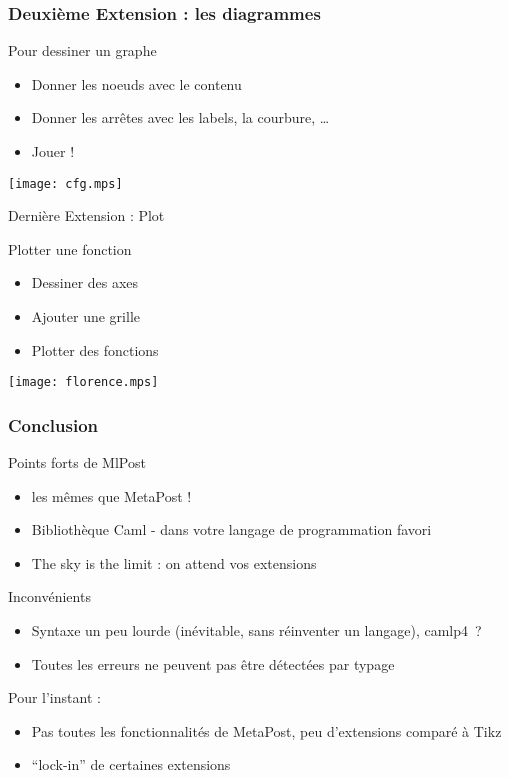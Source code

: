 \documentclass[nodefaultblocks]{beamer}
\begin{document}
\begin{frame}\frametitle{Deuxième Extension : les diagrammes}
  \begin{block}{Pour dessiner un graphe}
    \begin{itemize}
      \item Donner les noeuds avec le contenu
      \item Donner les arrêtes avec les labels, la courbure, \ldots
      \item Jouer ! 
    \end{itemize}
  \end{block}
  \begin{center}
    \texttt{[image: cfg.mps]}
  \end{center}
\end{frame}

\begin{frame}{Dernière Extension : Plot}
  \begin{block}{Plotter une fonction}
    \begin{itemize}
      \item Dessiner des axes
      \item Ajouter une grille
      \item Plotter des fonctions
    \end{itemize}
  \end{block}
  \begin{center}
    \texttt{[image: florence.mps]}
  \end{center}
\end{frame}

\begin{frame}\frametitle{Conclusion}

  \begin{block}{Points forts de MlPost}
    \begin{itemize}
      \item les mêmes que MetaPost ! 
      \item Bibliothèque Caml - dans votre langage de programmation favori
      \item The sky is the limit : on attend vos extensions
    \end{itemize}
  \end{block}
  
  \begin{block}{Inconvénients}
    \begin{itemize}
      \item Syntaxe un peu lourde (inévitable, sans réinventer un langage),
        camlp4~?
      \item Toutes les erreurs ne peuvent pas être détectées par typage
    \end{itemize}
    Pour l'instant :
    \begin{itemize}
      \item Pas toutes les fonctionnalités de MetaPost, peu d'extensions
        comparé à Tikz
      \item ``lock-in'' de certaines extensions
    \end{itemize}
  \end{block}
\end{frame}
\end{document}
